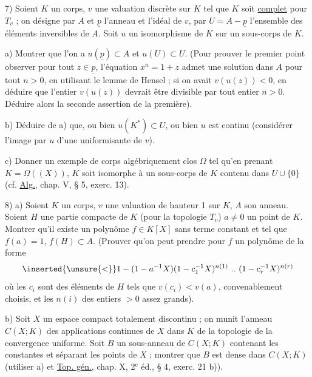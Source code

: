 7) Soient $K$ un corps, $v$ une valuation discrète sur $K$ tel que $K$ soit \uline{complet} pour $T_v$ ; on désigne par $A$ et $\underline p$ l'anneau et l'idéal de $v$, par $U=A-\underline p$ l'ensemble des éléments inversibles de $A$. Soit $u$ un isomorphisme de $K$ sur un sous-corps de $K$.

a) Montrer que l'on a $u(\underline p)\subset A$ et $u(U)\subset U$. (Pour prouver le premier point observer pour tout $z\in\underline p$, l'équation $x^n=1+z$ admet une solution dans $A$ pour tout $n>0$, en utilisant le lemme de Hensel ; si on avait $v(u(z))<0$, en déduire que l'entier $v(u(z))$ devrait être divisible par tout entier $n>0$. Déduire alors la seconde assertion de la première).

b) Déduire de a) que, ou bien $u(K^*)\subset U$, ou bien $u$ est continu (considérer l'image par $u$ d'une uniformisante de $v$).

c) Donner un exemple de corps algébriquement clos $\Omega$ tel qu'en prenant $K=\Omega((X))$, $K$ soit isomorphe à un sous-corps de $K$ contenu dans $U\cup\{0\}$ (cf. \uline{Alg.}, chap. V, § 5, exerc. 13).

8) a) Soient $K$ un corps, $v$ une valuation de hauteur 1 sur $K$, $A$ son anneau. Soient $H$ une partie compacte de $K$ (pour la topologie $T_v$) $a\ne0$ un point de $K$. Montrer qu'il existe un polynôme $f\in K[X]$ sans terme constant et tel que $f(a)=1$, $f(H)\subset A$. (Prouver qu'on peut prendre pour $f$ un polynôme de la forme
\[
\inserted{\unsure{<}}1-(1-a^{-1}X)(1-c_1^{-1}X)^{n(1)}\ ..\ (1-c_r^{-1}X)^{n(r)}
\]
où les $c_i$ sont des éléments de $H$ tels que $v(c_i)<v(a)$, convenablement choisis, et les $n(i)$ des entiers $>0$ assez grands).

b) Soit $X$ un espace compact totalement discontinu ; on munit l'anneau $C(X;K)$ des applications continues de $X$ dans $K$ de la topologie de la convergence uniforme. Soit $B$ un sous-anneau de $C(X;K)$ contenant les constantes et séparant les points de $X$ ; montrer que $B$ est dense dans $C(X;K)$ (utiliser a) et \uline{Top. gén.}, chap. X, 2$^{\mathrm e}$ éd., § 4, exerc. 21 b)).

